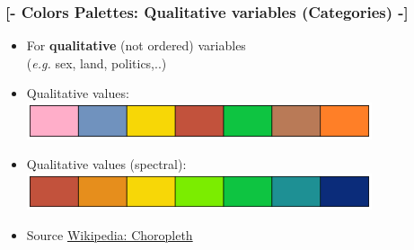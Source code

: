 \documentclass[xcolor=x11names,aspectratio=169, compress]{beamer}
\renewcommand{\(}{\begin{columns}}
\renewcommand{\)}{\end{columns}}
\newcommand{\<}[1]{\begin{column}{#1}}
\renewcommand{\>}{\end{column}}
\begin{document}
%


\begin{frame} %
\frametitle{\textcolor{brique}{[-  \textbf{Colors Palettes:} Qualitative variables (Categories) -]}}
\begin{center}
\begin{itemize}[<+-|alert@+>]
    \item[] For \textbf{qualitative} (not ordered) variables \\ (\textit{e.g.} sex, land, politics,..)
    \item Qualitative values: \hfill \includegraphics[width = 0.8\textwidth]{M5-ColorPaletteQualitative.png}
    \item Qualitative values (spectral): \hfill \includegraphics[width = 0.8\textwidth]{M5-ColorPaletteFullSpectral.png}
    \item[] \textcolor{gris}{\footnotesize{Source \href{https://en.wikipedia.org/wiki/Choropleth_map}{Wikipedia: Choropleth}}}
\end{itemize}
\end{center}
\end{frame}
\end{document}
